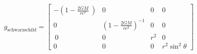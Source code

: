 \documentclass[preview]{standalone}
\begin{document}
\begin{align*}
g_\text{schwarzschild} = \begin{bmatrix} -\left(1 - \frac{2GM}{rc^2}\
                \right)  & 0 & 0 & 0 \\ 0 & \left(1 - \frac{2GM}{rc^2}\right)^{-1} & 0 & 0 \\ \
                0 & 0 & r^2 & 0 \\ 0 & 0 & 0 & r^2\sin^2 \theta \end{bmatrix}
\end{align*}
\end{document}
